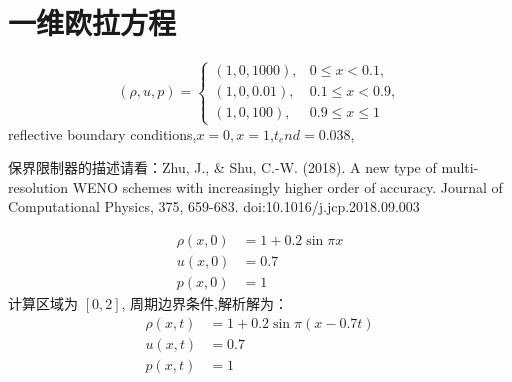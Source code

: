 \documentclass{book}
\begin{document}
\section{一维欧拉方程}
\begin{example}
    \begin{equation}
        (\rho,u,p)=
        \begin{cases}
            (1,0,1000), & 0\leqslant x<0.1,          \\
            (1,0,0.01), & 0.1 \leqslant x < 0.9,     \\
            (1,0,100),  & 0.9\leqslant x \leqslant 1
        \end{cases}
    \end{equation}
    reflective boundary conditions,$x=0,x=1$,$t_end=0.038$,

    保界限制器的描述请看：Zhu, J., \& Shu, C.-W. (2018). A new type of multi-resolution WENO schemes with increasingly higher order of accuracy. Journal of Computational Physics, 375, 659-683. doi:10.1016/j.jcp.2018.09.003

\end{example}
\begin{example}[一维对流方程光滑算例]
    \begin{equation}
        \begin{aligned}
            \rho(x, 0) & =1+0.2 \sin \pi x \\
            u(x, 0)    & =0.7              \\
            p(x, 0)    & =1
        \end{aligned}
    \end{equation}
    计算区域为 $[0,2]$, 周期边界条件,解析解为：
    \begin{equation}
        \begin{aligned}
            \rho(x, t) & =1+0.2 \sin \pi(x-0.7 t) \\
            u(x, t)    & =0.7                     \\
            p(x, t)    & =1
        \end{aligned}
    \end{equation}
\end{example}
\end{document}
